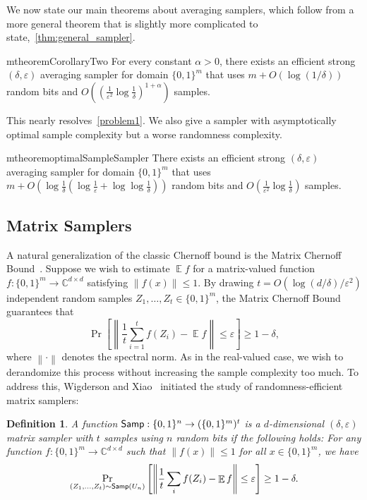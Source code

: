 \documentclass[10pt,a4paper]{article}
\newtheorem{definition}[theorem]{Definition}
\newcommand{\C}{\mathbb{C}}
\DeclareMathOperator*{\E}{\mathbb{E}}
\newcommand{\eps}{\varepsilon}
\newcommand{\1}{\mathbbm{1}}
\newcommand{\norm}[1]{\left\lVert #1\right\rVert}
\newcommand{\zo}{\{0, 1\}}
\newcommand{\Smp}{\textup{\textsf{Samp}}}
\newcommand{\Prb}[2][]{\Pr_{#1}\left[#2\right]}
\begin{document}
We now state our main theorems about averaging samplers, which follow from a more general theorem that is slightly more complicated to state,~\cref{thm:general_sampler}.

\begin{restatable}{mtheorem}{CorollaryTwo}
    \label{cor:domain_sampler}
     For every constant $\alpha > 0$, there exists an efficient strong $(\delta, \eps)$ averaging sampler for domain $\zo^m$ that uses  $m + O(\log(1/\delta))$ random bits and  $O((\frac{1}{\eps^{2}} \log \frac{1}{\delta})^{1 + \alpha})$ samples.
\end{restatable}

This nearly resolves~\cref{problem1}. We also give a sampler with asymptotically optimal sample complexity but a worse randomness complexity.


\begin{restatable}{mtheorem}{optimalSampleSampler}
    \label{lem:optimal_sample_sampler}
    There exists an efficient strong $(\delta, \eps)$ averaging sampler for domain $\zo^m$ that uses $m + O(\log\frac{1}{\delta} (\log \frac{1}{\eps} + \log\log\frac{1}{\delta} ))$ random bits and $O(\frac{1}{\eps^{2}} \log \frac{1}{\delta})$ samples. 
\end{restatable}


\subsection{Matrix Samplers}
A natural generalization of the classic Chernoff bound is the Matrix Chernoff Bound~\cite{Rud99, AW02, Tro12}. Suppose we wish to estimate $\E f$ for a matrix-valued function $f: \zo^m \to \C^{d \times d}$ satisfying $\norm{f(x)} \le 1$.
By drawing $t = O(\log(d/\delta)/\eps^2)$ independent random samples $Z_1, \dots, Z_t \in \zo^m$, the
Matrix Chernoff Bound guarantees that \[
    \Prb{\norm{\frac{1}{t} \sum_{i=1}^t f(Z_i) - \E f} \le \eps} \ge 1 - \delta,
\]
where $\norm{\cdot}$ denotes the spectral norm.
As in the real-valued case, we wish to derandomize this process without increasing the sample complexity too much. 
To address this, Wigderson and Xiao~\cite{WX05} initiated the study of randomness-efficient matrix samplers:
\begin{definition}
    A function $\Smp : \zo^n \to (\zo^m)^t$ is a $d$-dimensional $(\delta, \eps)$ matrix sampler with $t$ samples using $n$ random bits if the following holds: For any function $f : \zo^m \to \C^{d \times d}$ such that $\|f(x)\| \leq 1$ for all $x \in \zo^m$, we have
    \[
    \Pr_{(Z_1, \dots, Z_t) \sim \Smp(U_n)}
    \left[ \norm{\frac{1}{t}  \sum_i f(Z_i) - \E f} \leq \varepsilon \right]
    \geq 1 - \delta.
    \]
\end{definition}
\end{document}
